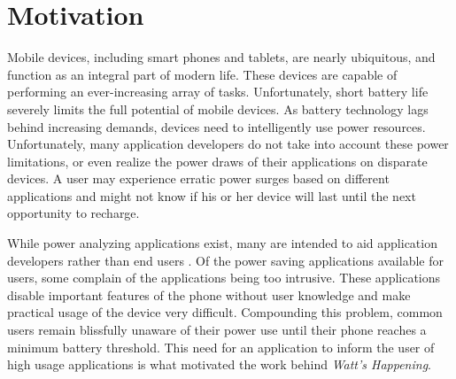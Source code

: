 \section{Motivation}
\label{sec:motivation}
Mobile devices, including smart phones and tablets, are nearly ubiquitous, and function as an integral part of modern life. 
These devices are capable of performing an ever-increasing array of tasks. 
Unfortunately, short battery life severely limits the full potential of mobile devices. 
As battery technology lags behind increasing demands, devices need to intelligently use power resources. 
Unfortunately, many application developers do not take into account these power limitations, or even realize the power draws of their applications on disparate devices. 
A user may experience erratic power surges based on different applications and might not know if his or her device will last until the next opportunity to recharge. 

While power analyzing applications exist, many are intended to aid application developers rather than end users \cite{Pathak:2012:ESI:2168836.2168841} \cite{energy-aware}. 
Of the power saving applications available for users, some complain of the applications being too intrusive. 
These applications disable important features of the phone without user knowledge and make practical usage of the device very difficult. 
Compounding this problem, common users remain blissfully unaware of their power use until their phone reaches a minimum battery threshold.
This need for an application to inform the user of high usage applications is what motivated the work behind \emph{Watt's Happening}.
